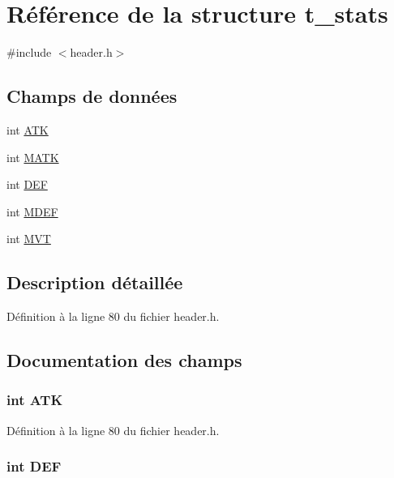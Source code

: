 \hypertarget{structt__stats}{\section{Référence de la structure t\-\_\-stats}
\label{structt__stats}
}


{\ttfamily \#include $<$header.\-h$>$}

\subsection*{Champs de données}
\begin{DoxyCompactItemize}
\item 
int \hyperlink{structt__stats_a3b3918526788ae6b163c41dc25326396}{A\-T\-K}
\item 
int \hyperlink{structt__stats_ae183b98dc9aca9905f531bfd4dd51a1c}{M\-A\-T\-K}
\item 
int \hyperlink{structt__stats_a30707041436614e9e3759b7bf533b201}{D\-E\-F}
\item 
int \hyperlink{structt__stats_a92ab6d75a95ed209b7875314f53fb555}{M\-D\-E\-F}
\item 
int \hyperlink{structt__stats_a397f7940443939415a50f324dc5f56f9}{M\-V\-T}
\end{DoxyCompactItemize}


\subsection{Description détaillée}


Définition à la ligne 80 du fichier header.\-h.



\subsection{Documentation des champs}
\hypertarget{structt__stats_a3b3918526788ae6b163c41dc25326396}{
\subsubsection[{A\-T\-K}]{\setlength{\rightskip}{0pt plus 5cm}int A\-T\-K}}\label{structt__stats_a3b3918526788ae6b163c41dc25326396}


Définition à la ligne 80 du fichier header.\-h.

\hypertarget{structt__stats_a30707041436614e9e3759b7bf533b201}{
\subsubsection[{D\-E\-F}]{\setlength{\rightskip}{0pt plus 5cm}int D\-E\-F}}\label{structt__stats_a30707041436614e9e3759b7bf533b201}


